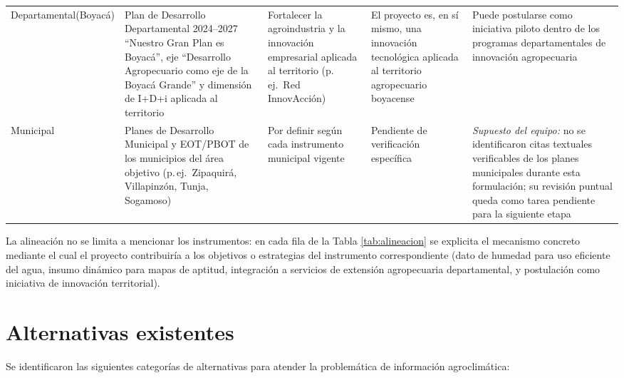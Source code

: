 \documentclass[11pt,a4paper]{article}
\newcommand{\supuesto}[1]{\textit{Supuesto del equipo: #1}}
\begin{document}
\begin{longtable}{L{2.5cm}L{2.9cm}L{2.9cm}L{2.8cm}L{2.6cm}}
Departamental\newline(Boyacá) & Plan de Desarrollo Departamental 2024--2027 ``Nuestro Gran Plan es Boyacá'', eje ``Desarrollo Agropecuario como eje de la Boyacá Grande'' y dimensión de I+D+i aplicada al territorio \citep{boyaca_pdd2024} & Fortalecer la agroindustria y la innovación empresarial aplicada al territorio (p.\,ej.\ Red InnovAcción) & El proyecto es, en sí mismo, una innovación tecnológica aplicada al territorio agropecuario boyacense & Puede postularse como iniciativa piloto dentro de los programas departamentales de innovación agropecuaria\\
Municipal & Planes de Desarrollo Municipal y EOT/PBOT de los municipios del área objetivo (p.\,ej.\ Zipaquirá, Villapinzón, Tunja, Sogamoso) & Por definir según cada instrumento municipal vigente & Pendiente de verificación específica & \supuesto{} no se identificaron citas textuales verificables de los planes municipales durante esta formulación; su revisión puntual queda como tarea pendiente para la siguiente etapa\\
\bottomrule
\end{longtable}
\endgroup

\noindent La alineación no se limita a mencionar los instrumentos: en cada fila de la Tabla \ref{tab:alineacion} se explicita el mecanismo concreto mediante el cual el proyecto contribuiría a los objetivos o estrategias del instrumento correspondiente (dato de humedad para uso eficiente del agua, insumo dinámico para mapas de aptitud, integración a servicios de extensión agropecuaria departamental, y postulación como iniciativa de innovación territorial).

\section{Alternativas existentes}

Se identificaron las siguientes categorías de alternativas para atender la problemática de información agroclimática:
\end{document}

